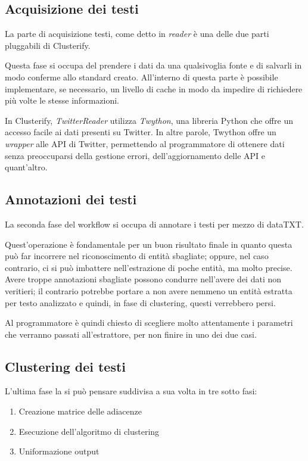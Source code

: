 	\subsection{Acquisizione dei testi}
		La parte di acquisizione testi, come detto in \emph{reader} è una delle due parti pluggabili di Clusterify.

		Questa fase si occupa del prendere i dati da una qualsivoglia fonte e di salvarli in modo conferme allo standard creato. All'interno di questa parte è possibile implementare, se necessario, un livello di cache in modo da impedire di richiedere più volte le stesse informazioni.

		In Clusterify, \emph{TwitterReader} utilizza \emph{Twython}, una libreria Python che offre un accesso facile ai dati presenti su Twitter\cite{twython}. In altre parole, Twython offre un \emph{wrapper} alle API di Twitter, permettendo al programmatore di ottenere dati senza preoccuparsi della gestione errori, dell'aggiornamento delle API e quant'altro. 

	\subsection{Annotazioni dei testi}
		La seconda fase del workflow si occupa di annotare i testi per mezzo di dataTXT.
		
		Quest'operazione è fondamentale per un buon risultato finale in quanto questa può far incorrere nel riconoscimento di entità sbagliate; oppure, nel caso contrario, ci si può imbattere nell'estrazione di poche entità, ma molto precise. Avere troppe annotazioni sbagliate possono condurre nell'avere dei dati non veritieri; il contrario potrebbe portare a non avere nemmeno un entità estratta per testo analizzato e quindi, in fase di clustering, questi verrebbero persi.

		Al programmatore è quindi chiesto di scegliere molto attentamente i parametri che verranno passati all'estrattore, per non finire in uno dei due casi.

	\subsection{Clustering dei testi}
		L'ultima fase la si può pensare suddivisa a sua volta in tre sotto fasi:

		\begin{enumerate}
  			\item Creazione matrice delle adiacenze
  			\item Esecuzione dell'algoritmo di clustering
 			\item Uniformazione output
		\end{enumerate} 

